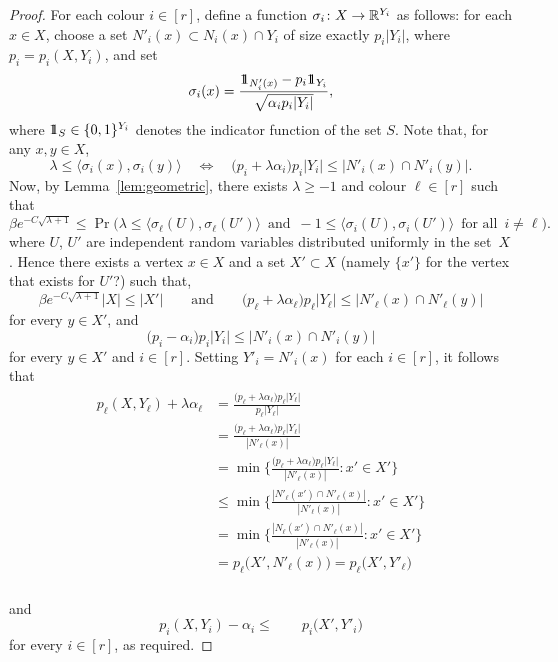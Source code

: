   \begin{proof}

    For each colour $i \in [r]$, define a function $\sigma_i \colon X \rightarrow \mathbb{R}^{Y_i}$ as follows: for each $x \in X$, choose a set $N'_i(x) \subset N_i(x) \cap Y_i$ of size exactly $p_i|Y_i|$, where $p_i = p_i(X,Y_i)$, and set
    $$\sigma_i(x) = \frac{\hbox{$1\mkern-6.5mu1$}_{N'_i(x)} - p_i\hbox{$1\mkern-6.5mu1$}_{Y_i}}{\sqrt{\alpha_ip_i|Y_i|}},$$
    where $\hbox{$1\mkern-6.5mu1$}_S \in \{0,1\}^{Y_i}$ denotes the indicator function of the set $S$. Note that, for any $x,y\in X$,
    $$\lambda \le \big\langle \sigma_i(x),\sigma_i(y) \big\rangle \quad \Leftrightarrow \quad \big( p_i + \lambda\alpha_i \big) p_i |Y_i| \le |N'_i(x) \cap N'_i(y)|.$$
    Now, by Lemma~\ref{lem:geometric}, there exists $\lambda \ge -1$ and colour $\ell \in [r]$ such that
    $$\beta e^{- C\sqrt{\lambda + 1}} \le \Pr\Big( \lambda  \le \big\langle \sigma_\ell(U),\sigma_\ell(U') \big\rangle \, \text{ and } \, -1 \le \big\langle \sigma_i(U), \sigma_i(U') \big\rangle \, \text{ for all } \, i \ne \ell \Big) .$$
    where $U$, $U'$ are independent random variables distributed uniformly in the set~$X$. Hence there exists a vertex $x \in X$ and a set $X' \subset X$ (namely $\{x'\}$ for the vertex that exists for $U'$?) %
    such that,
    $$\beta e^{- C \sqrt{\lambda + 1}} |X|  \le |X'|  \qquad \text{and} \qquad  \big( p_\ell + \lambda\alpha_\ell \big) p_\ell |Y_\ell | \le |N'_\ell(x) \cap N'_\ell(y)|$$
    for every $y \in X'$, and
    $$\big( p_i - \alpha_i \big) p_i |Y_i| \le |N'_i(x) \cap N'_i(y)|$$
    for every $y \in X'$ and $i \in [r]$. Setting $Y'_i = N'_i(x)$ for each $i \in [r]$, it follows that
    \begin{multline}
        \begin{aligned}
        p_\ell(X,Y_\ell) + \lambda \alpha_\ell &= \frac{ \big( p_\ell + \lambda\alpha_\ell \big) p_\ell |Y_\ell |}{p_\ell |Y_\ell|}\\
        &= \frac{ \big( p_\ell + \lambda\alpha_\ell \big) p_\ell |Y_\ell |}{| N'_\ell (x)|}\\
        &= \min\bigg\{ \frac{ \big( p_\ell + \lambda\alpha_\ell \big) p_\ell |Y_\ell |}{| N'_\ell (x)|} : x' \in X' \bigg\}\\
        &\le \min\bigg\{ \frac{|N'_\ell(x') \cap  N'_\ell (x)|}{| N'_\ell (x)|} : x' \in X' \bigg\}\\
        &= \min\bigg\{ \frac{|N_\ell(x') \cap  N'_\ell (x)|}{| N'_\ell (x)|} : x' \in X' \bigg\}\\
        &= p_\ell\big( X', N'_\ell (x) \big) = p_\ell\big( X', Y'_\ell \big) \\
      \end{aligned}
    \end{multline}

    and $$  p_i(X,Y_i) - \alpha_i \le \qquad p_i\big( X', Y'_i \big) $$
    for every $i \in [r]$, as required.
  \end{proof}

